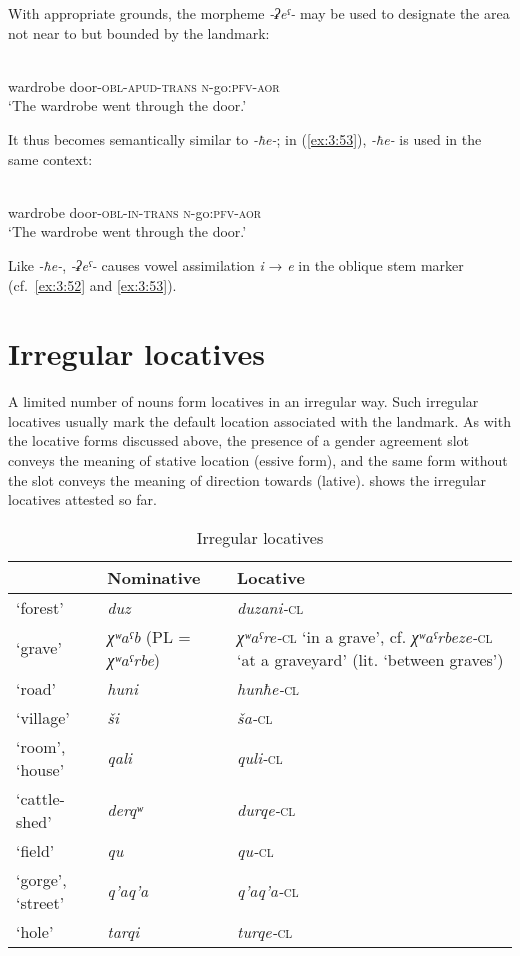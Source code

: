 ﻿\documentclass[output=paper]{langsci/langscibook}
\begin{document}
With appropriate grounds, the morpheme \emph{-ʡeˤ-} may be used to
designate the area not near to but bounded by the landmark:

\ea \label{ex:3:52}
\\
wardrobe door-\textsc{obl}-\textsc{apud}-\textsc{trans} \textsc{n}-go:\textsc{pfv}-\textsc{aor}\\
\glt `The wardrobe went through the door.'
\z

It thus becomes semantically similar to \emph{-ħe-}; in (\ref{ex:3:53}),
\emph{-ħe-} is used in the same context:

\ea \label{ex:3:53}
\\
wardrobe door-\textsc{obl}-\textsc{in}-\textsc{trans} \textsc{n}-go:\textsc{pfv}-\textsc{aor}\\
\glt `The wardrobe went through the door.'
\z

Like \emph{-ħe-}, \emph{-ʡeˤ-} causes vowel assimilation
\emph{i} → \emph{e} in the oblique stem marker (cf.\ \ref{ex:3:52} and \ref{ex:3:53}).



\section{Irregular locatives}\label{irregular-locatives}

A limited number of nouns form locatives in an irregular way. Such
irregular locatives usually mark the default location associated with
the landmark. As with the locative forms discussed above, the presence
of a gender agreement slot conveys the meaning of stative location
(essive form), and the same form without the slot conveys the meaning of
direction towards (lative).  shows the irregular locatives attested so
far.

\begin{table}[h]
  \caption{Irregular locatives}\label{tab:3:38}
  \begin{tabular}{@{}llp{}@{}}
\toprule 
&  Nominative & Locative  \tabularnewline \midrule  
`forest' &  \emph{duz}  & \emph{duzani-}\textsc{cl} \tabularnewline
`grave' & \emph{χʷaˤb} (PL = \emph{χʷaˤrbe}) &  \emph{χʷaˤre-}\textsc{cl} `in a grave',
   cf. \emph{χʷaˤrbeze-}\textsc{cl} `at a graveyard'
    (lit. `between graves')\tabularnewline
`road' & \emph{huni} & \emph{hunħe-}\textsc{cl} \tabularnewline
`village'  &  \emph{ši}  &  \emph{ša-}\textsc{cl} \tabularnewline
`room', `house' &  \emph{qali} & \emph{quli-}\textsc{cl} \tabularnewline
`cattle-shed' &  \emph{derqʷ} & \emph{durqe-}\textsc{cl} \tabularnewline
`field'  & \emph{qu}  & \emph{qu-}\textsc{cl} \tabularnewline
`gorge', `street' & \emph{q'aq'a} & \emph{q'aq'a-}\textsc{cl} \tabularnewline
`hole' & \emph{tarqi} & \emph{turqe-}\textsc{cl}\tabularnewline
\bottomrule
  \end{tabular}
\vspace{-2\jot}
\end{table}
\end{document}
